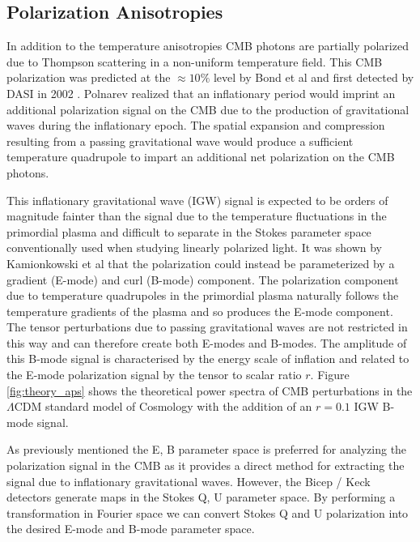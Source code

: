 \documentclass[12pt]{article}
\begin{document}
\subsection{Polarization Anisotropies}
In addition to the temperature anisotropies CMB photons are partially
polarized due to Thompson scattering in a non-uniform temperature field. This
CMB polarization was predicted at the $\approx 10\%$ level by Bond et al
\cite{cite:Bond} and first detected by DASI in 2002 \cite{cite:DASI}. Polnarev
\cite{cite:Polnarev} realized that an inflationary period would imprint an
additional polarization signal on the CMB due to the production of
gravitational waves during the inflationary epoch. The spatial expansion and
compression resulting from a passing gravitational wave would produce a
sufficient temperature quadrupole to impart an additional net polarization on the CMB
photons.



This inflationary gravitational wave (IGW) signal is expected to be orders of
magnitude fainter than the signal due to the temperature fluctuations in the
primordial plasma and difficult to
separate in the Stokes parameter space conventionally used when studying
linearly polarized light. It was shown by Kamionkowski et al
\cite{cite:Kamionkowski} that the polarization could instead be parameterized
by a gradient (E-mode) and curl (B-mode) component. The polarization component
due to temperature quadrupoles in the primordial plasma naturally follows the
temperature gradients of the plasma and so produces the E-mode component. The
tensor perturbations due to passing gravitational waves are not restricted in
this way and can therefore create both E-modes and B-modes. The amplitude of
this B-mode signal is characterised by the energy scale of inflation and
related to the E-mode polarization signal by the tensor to scalar ratio $r$.
Figure \ref{fig:theory_aps} shows the theoretical power spectra of CMB
perturbations in the $\Lambda$CDM standard model of Cosmology with the
addition of an $r=0.1$ IGW B-mode signal. 

As previously mentioned the E, B parameter space is preferred for analyzing
the polarization signal in the CMB as it provides a direct method for
extracting the signal due to inflationary gravitational waves. However, the Bicep /
Keck detectors generate maps in the Stokes Q, U parameter space. By performing
a transformation in Fourier space we can convert Stokes Q and U polarization
into the desired E-mode and B-mode parameter space.
\end{document}
